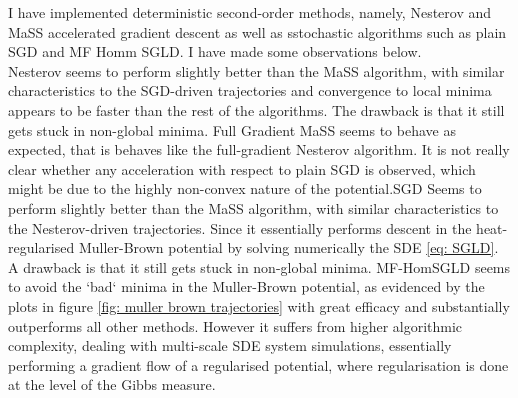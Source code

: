 \documentclass{article}
\theoremstyle{mystyle}
\begin{document}
I have implemented deterministic second-order methods, namely, Nesterov and MaSS accelerated gradient descent as well as sstochastic algorithms such as plain SGD and MF Homm SGLD. I have made some observations below.\\

Nesterov seems to perform slightly better than the MaSS algorithm, with similar characteristics to the SGD-driven trajectories and convergence to local minima appears to be faster than the rest of the algorithms. The drawback is that it still gets stuck in non-global minima. Full Gradient MaSS seems to behave as expected, that is behaves like the full-gradient Nesterov algorithm. It is not really clear whether any acceleration with respect to plain SGD is observed, which might be due to the highly non-convex nature of the potential.SGD  Seems to perform slightly better than the MaSS algorithm, with similar characteristics to the Nesterov-driven trajectories. Since it essentially performs descent in the heat-regularised Muller-Brown potential by solving numerically the SDE \ref{eq: SGLD}. A drawback is that it still gets stuck in non-global minima. MF-HomSGLD seems to avoid the `bad` minima in the Muller-Brown potential, as evidenced by the plots in figure \ref{fig: muller brown trajectories} with great efficacy and substantially outperforms all other methods. However it suffers from higher algorithmic complexity, dealing with multi-scale SDE system simulations, essentially performing a gradient flow of a regularised potential, where regularisation is done at the level of the Gibbs measure.
\end{document}
